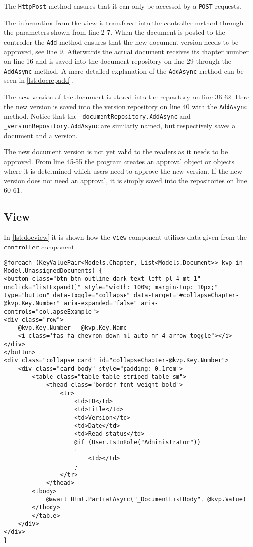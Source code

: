 The \texttt{HttpPost} method ensures that it can only be accessed by a \texttt{POST} requests.

The information from the view is transfered into the controller method through the parameters shown from line 2-7.
When the document is posted to the controller the \texttt{Add} method ensures that the new document version needs to be approved, see line 9.
Afterwards the actual document receives its chapter number on line 16 and is saved into the document repository on line 29 through the \texttt{AddAsync} method.
A more detailed explanation of the \texttt{AddAsync} method can be seen in \cref{lst:docrepadd}.

The new version of the document is stored into the repository on line 36-62.
Here the new version is saved into the version repository on line 40 with the \texttt{AddAsync} method.
Notice that the \texttt{_documentRepository.AddAsync} and \texttt{_versionRepository.AddAsync} are similarly named, but respectively saves a document and a version.

The new document version is not yet valid to the readers as it needs to be approved.
From line 45-55 the program creates an approval object or objects where it is determined which users need to approve the new version.
If the new version does not need an approval, it is simply saved into the repositories on line 60-61.

\subsection{View}

In \cref{lst:docview} it is shown how the \texttt{view} component utilizes data given from the \texttt{controller} component.

\begin{lstlisting}[caption={Document View: Index}, label={lst:docview}]
@foreach (KeyValuePair<Models.Chapter, List<Models.Document>> kvp in Model.UnassignedDocuments) {
<button class="btn btn-outline-dark text-left pl-4 mt-1" onclick="listExpand()" style="width: 100%; margin-top: 10px;" type="button" data-toggle="collapse" data-target="#collapseChapter-@kvp.Key.Number" aria-expanded="false" aria-controls="collapseExample">
<div class="row">
	@kvp.Key.Number | @kvp.Key.Name
	<i class="fas fa-chevron-down ml-auto mr-4 arrow-toggle"></i>
</div>
</button>
<div class="collapse card" id="collapseChapter-@kvp.Key.Number">
	<div class="card-body" style="padding: 0.1rem">
		<table class="table table-striped table-sm">
			<thead class="border font-weight-bold">
				<tr>
					<td>ID</td>
					<td>Title</td>
					<td>Version</td>
					<td>Date</td>
					<td>Read status</td>
					@if (User.IsInRole("Administrator"))
					{
						<td></td>
					}
				</tr>
			</thead>
		<tbody>
			@await Html.PartialAsync("_DocumentListBody", @kvp.Value)
		</tbody>
		</table>
	</div>
</div>
}

\end{lstlisting}

